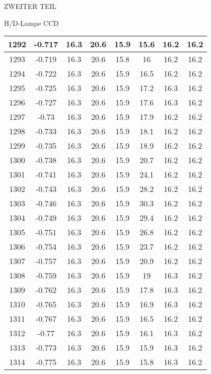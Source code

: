 \begin{appendix}
\begin{chapter}{ZWEITER TEIL}
\begin{section}{H/D-Lampe CCD}
\begin{scriptsize}
\begin{longtable}[htbp]{|c|c|c|c|c|c|c|c|}
            1292 & -0.717 & 16.3 & 20.6 & 15.9 & 15.6 & 16.2 & 16.2 \\ \hline
            1293 & -0.719 & 16.3 & 20.6 & 15.8 & 16 & 16.2 & 16.2 \\ \hline
            1294 & -0.722 & 16.3 & 20.6 & 15.9 & 16.5 & 16.2 & 16.2 \\ \hline
            1295 & -0.725 & 16.3 & 20.6 & 15.9 & 17.2 & 16.3 & 16.2 \\ \hline
            1296 & -0.727 & 16.3 & 20.6 & 15.9 & 17.6 & 16.3 & 16.2 \\ \hline
            1297 & -0.73 & 16.3 & 20.6 & 15.9 & 17.9 & 16.2 & 16.2 \\ \hline
            1298 & -0.733 & 16.3 & 20.6 & 15.9 & 18.1 & 16.2 & 16.2 \\ \hline
            1299 & -0.735 & 16.3 & 20.6 & 15.9 & 18.9 & 16.2 & 16.2 \\ \hline
            1300 & -0.738 & 16.3 & 20.6 & 15.9 & 20.7 & 16.2 & 16.2 \\ \hline
            1301 & -0.741 & 16.3 & 20.6 & 15.9 & 24.1 & 16.2 & 16.2 \\ \hline
            1302 & -0.743 & 16.3 & 20.6 & 15.9 & 28.2 & 16.2 & 16.2 \\ \hline
            1303 & -0.746 & 16.3 & 20.6 & 15.9 & 30.3 & 16.2 & 16.2 \\ \hline
            1304 & -0.749 & 16.3 & 20.6 & 15.9 & 29.4 & 16.2 & 16.2 \\ \hline
            1305 & -0.751 & 16.3 & 20.6 & 15.9 & 26.8 & 16.2 & 16.2 \\ \hline
            1306 & -0.754 & 16.3 & 20.6 & 15.9 & 23.7 & 16.2 & 16.2 \\ \hline
            1307 & -0.757 & 16.3 & 20.6 & 15.9 & 20.9 & 16.2 & 16.2 \\ \hline
            1308 & -0.759 & 16.3 & 20.6 & 15.9 & 19 & 16.3 & 16.2 \\ \hline
            1309 & -0.762 & 16.3 & 20.6 & 15.9 & 17.8 & 16.3 & 16.2 \\ \hline
            1310 & -0.765 & 16.3 & 20.6 & 15.9 & 16.9 & 16.3 & 16.2 \\ \hline
            1311 & -0.767 & 16.3 & 20.6 & 15.9 & 16.5 & 16.2 & 16.2 \\ \hline
            1312 & -0.77 & 16.3 & 20.6 & 15.9 & 16.1 & 16.3 & 16.2 \\ \hline
            1313 & -0.773 & 16.3 & 20.6 & 15.9 & 15.9 & 16.3 & 16.2 \\ \hline
            1314 & -0.775 & 16.3 & 20.6 & 15.9 & 15.8 & 16.3 & 16.2 \\ \hline

\end{longtable}
\end{scriptsize}
\end{section}
\end{chapter}
\end{appendix}
